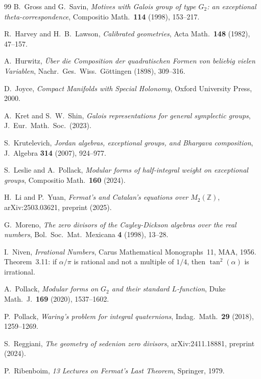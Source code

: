 \documentclass[11pt]{amsart}
\theoremstyle{plain}
\theoremstyle{definition}
\theoremstyle{remark}
\newcommand{\Z}{\mathbb{Z}}
\begin{document}
\begin{thebibliography}{99}
B.~Gross and G.~Savin,
\emph{Motives with Galois group of type $G_2$: an exceptional theta-correspondence},
Compositio Math.\ \textbf{114} (1998), 153--217.

R.~Harvey and H.~B.~Lawson,
\emph{Calibrated geometries},
Acta Math.\ \textbf{148} (1982), 47--157.

A.~Hurwitz,
\emph{\"Uber die Composition der quadratischen Formen von beliebig vielen Variablen},
Nachr.\ Ges.\ Wiss.\ G\"ottingen (1898), 309--316.

D.~Joyce,
\emph{Compact Manifolds with Special Holonomy},
Oxford University Press, 2000.

A.~Kret and S.~W.~Shin,
\emph{Galois representations for general symplectic groups},
J.~Eur.\ Math.\ Soc.\ (2023).

S.~Krutelevich,
\emph{Jordan algebras, exceptional groups, and Bhargava composition},
J.~Algebra \textbf{314} (2007), 924--977.

S.~Leslie and A.~Pollack,
\emph{Modular forms of half-integral weight on exceptional groups},
Compositio Math.\ \textbf{160} (2024).

H.~Li and P.~Yuan,
\emph{Fermat's and Catalan's equations over $M_2(\Z)$},
arXiv:2503.03621, preprint (2025).

G.~Moreno,
\emph{The zero divisors of the Cayley-Dickson algebras over the real numbers},
Bol.\ Soc.\ Mat.\ Mexicana \textbf{4} (1998), 13--28.

I.~Niven,
\emph{Irrational Numbers},
Carus Mathematical Monographs~11, MAA, 1956.
Theorem~3.11: if $\alpha/\pi$ is rational and not a multiple of $1/4$,
then $\tan^2(\alpha)$ is irrational.

A.~Pollack,
\emph{Modular forms on $G_2$ and their standard $L$-function},
Duke Math.\ J.\ \textbf{169} (2020), 1537--1602.

P.~Pollack,
\emph{Waring's problem for integral quaternions},
Indag.\ Math.\ \textbf{29} (2018), 1259--1269.

S.~Reggiani,
\emph{The geometry of sedenion zero divisors},
arXiv:2411.18881, preprint (2024).

P.~Ribenboim,
\emph{13 Lectures on Fermat's Last Theorem},
Springer, 1979.


\end{thebibliography}
\end{document}
